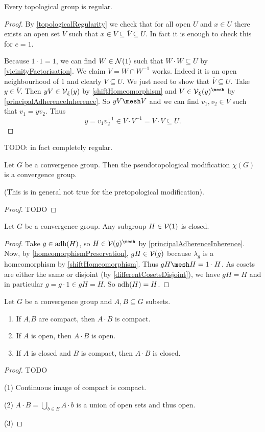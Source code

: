 \begin{proposition}
Every topological group is regular.
\end{proposition}
\begin{proof}
By \ref{topologicalRegularity} we check that for all open $U$ and $x\in U$ there exists an open set $V$ such that $x\in V\subseteq \overline{V}\subseteq U$. In fact it is enough to check this for $e = 1$.\

Because $1\cdot 1 = 1$, we can find $W\in\operatorname{\mathcal{N}}(1)$ such that $W\cdot W \subseteq U$ by \ref{vicinityFactorisation}. We claim $V= W\cap W^{-1}$ works. Indeed it is an open neighbourhood of $1$ and clearly $V\subseteq U$. We just need to show that $\overline{V}\subseteq U$. Take $y\in \overline{V}$. Then $yV\in \operatorname{\mathcal{V}}_\xi(y)$ by \ref{shiftHomeomorphism} and $V\in \vicinity_\xi(y)^{\mesh}$ by \ref{principalAdherenceInherence}. So $yV\mesh V$ and we can find $v_1,v_2\in V$ such that $v_1 = yv_2$. Thus
\[ y = v_1v_2^{-1} \in V\cdot V^{-1} = V\cdot V \subseteq U. \]
\end{proof}
TODO: in fact completely regular.

\begin{proposition}
Let $G$ be a convergence group. Then the pseudotopological modification $\chi(G)$ is a convergence
group.
\end{proposition}
(This is in general not true for the pretopological modification).
\begin{proof}
TODO
\end{proof}

\begin{proposition}
Let $G$ be a convergence group. Any subgroup $H\in\operatorname{\mathcal{V}}(1)$ is closed.
\end{proposition}
\begin{proof}
Take $g\in \operatorname{adh}(H)$, so $H\in \vicinity(g)^{\mesh}$ by \ref{principalAdherenceInherence}. Now, by \ref{homeomorphismPreservation}, $gH\in \operatorname{\mathcal{V}}(g)$ because $\lambda_g$ is a homeomorphism by \ref{shiftHomeomorphism}. Thus $gH \mesh H = 1\cdot H$. As cosets are either the same or disjoint (by \ref{differentCosetsDisjoint}), we have $gH = H$ and in particular $g = g\cdot 1 \in gH = H$. So $\operatorname{adh}(H) = H$.
\end{proof}

\begin{proposition}
Let $G$ be a convergence group and $A,B\subseteq G$ subsets.
\begin{enumerate}
\item If $A$,$B$ are compact, then $A\cdot B$ is compact.
\item If $A$ is open, then $A\cdot B$ is open.
\item If $A$ is closed and $B$ is compact, then $A\cdot B$ is closed.
\end{enumerate}
\end{proposition}
\begin{proof}
TODO

(1) Continuous image of compact is compact.

(2) $A\cdot B = \bigcup_{b\in B} A\cdot b$ is a union of open sets and thus open.

(3)
\end{proof}

